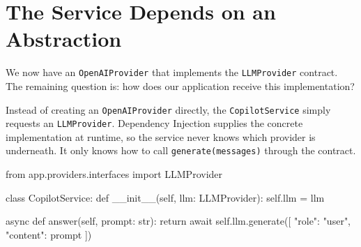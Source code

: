 \documentclass[11pt]{article}
\begin{document}
\section*{The Service Depends on an Abstraction}
\vspace{0.15in}

We now have an \texttt{OpenAIProvider} that implements the \texttt{LLMProvider} contract. The remaining question is: how does our application receive this implementation?


Instead of creating an \texttt{OpenAIProvider} directly, the \texttt{CopilotService} simply requests an \texttt{LLMProvider}. Dependency Injection supplies the concrete implementation at runtime, so the service never knows which provider is underneath. It only knows how to call \texttt{generate(messages)} through the contract.

\vspace{0.1in}

\begin{codebox}
from app.providers.interfaces import LLMProvider

class CopilotService:
    def __init__(self, llm: LLMProvider):
        self.llm = llm

    async def answer(self, prompt: str):
        return await self.llm.generate([
            {"role": "user", "content": prompt}
        ])
\end{codebox}

\vspace{0.3in}
\end{document}
